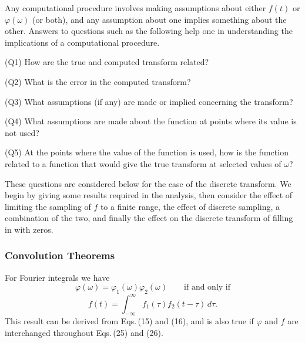 \documentclass[twoside]{MATH77}
\begin{document}
Any computational procedure involves making assumptions about either
$f(t)$ or $\varphi (\omega )$ (or both), and any assumption about one
implies something about the other. Answers to questions such as the
following help one in understanding the implications of a
computational procedure.

(Q1) How are the true and computed transform related?

(Q2) What is the error in the computed transform?

(Q3) What assumptions (if any) are made or implied concerning the transform?

(Q4) What assumptions are made about the function at points where its value
is not used?

(Q5) At the points where the value of the function is used, how is the
function related to a function that would give the true transform at
selected values of $\omega ?$

These questions are considered below for the case of the discrete
transform. We begin by giving some results required in the analysis,
then consider the effect of limiting the sampling of $f$ to a finite
range, the effect of discrete sampling, a combination of the two, and
finally the effect on the discrete transform of filling in with zeros.

\subsubsection{Convolution Theorems}

For Fourier integrals we have
\begin{equation}\label{O25}
\varphi (\omega )=\varphi _1(\omega )\varphi _2(\omega )\qquad
\text{if and only if}
\end{equation}
\vspace{-10pt}
\begin{equation}\label{O26}
f(t)=\int_{-\infty }^\infty f_1(\tau )f_2(t-\tau )\,d\tau .
\end{equation}
This result can be derived from Eqs.\,(15) and (16), and is also true
if $\varphi $ and $f$ are interchanged throughout Eqs.\,(25) and (26).
\end{document}
